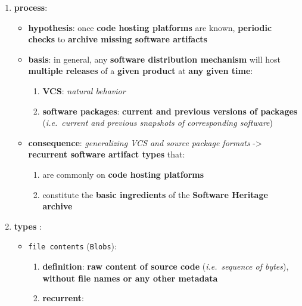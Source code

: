 \documentclass[11pt]{article}
\providecommand{\tightlist}{%
      \setlength{\itemsep}{0pt}\setlength{\parskip}{0pt}}
\begin{document}
\begin{enumerate}
\def\labelenumi{\arabic{enumi}.}
\tightlist
\item
  \textbf{process}:

  \begin{itemize}
  \tightlist
  \item
    \textbf{hypothesis}: once \textbf{code hosting platforms} are known,
    \textbf{periodic checks} to \textbf{archive missing software
    artifacts}
  \item
    \textbf{basis}: in general, any \textbf{software distribution
    mechanism} will host \textbf{multiple releases} of a \textbf{given
    product} at \textbf{any given time}:

    \begin{enumerate}
    \def\labelenumii{\arabic{enumii}.}
    \tightlist
    \item
      \textbf{VCS}: \emph{natural behavior}
    \item
      \textbf{software packages}: \textbf{current and previous versions
      of packages} (\emph{i.e.~current and previous snapshots of
      corresponding software})
    \end{enumerate}
  \item
    \textbf{consequence}: \emph{generalizing VCS and source package
    formats} -\textgreater{} \textbf{recurrent software artifact types}
    that:

    \begin{enumerate}
    \def\labelenumii{\arabic{enumii}.}
    \tightlist
    \item
      are commonly on \textbf{code hosting platforms}
    \item
      constitute the \textbf{basic ingredients} of the \textbf{Software
      Heritage archive}
    \end{enumerate}
  \end{itemize}
\item
  \textbf{types} :

  \begin{itemize}
  \tightlist
  \item
    \texttt{file\ contents} (\texttt{Blobs}):

    \begin{enumerate}
    \def\labelenumii{\arabic{enumii}.}
    \tightlist
    \item
      \textbf{definition}: \textbf{raw content of source code}
      (\emph{i.e.~sequence of bytes}), \textbf{without file names or any
      other metadata}
    \item
      \textbf{recurrent}:


\end{enumerate}
\end{itemize}
\end{enumerate}
\end{document}
